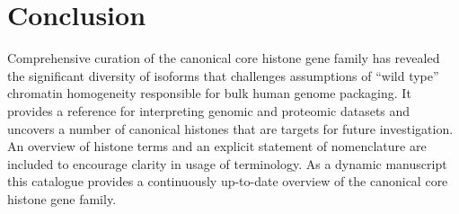 \section{Conclusion}
\label{sec:conclusion}

	Comprehensive curation of the canonical core histone gene family 
	has revealed the significant diversity of isoforms 
	that challenges assumptions of ``wild type'' chromatin homogeneity
	responsible for bulk human genome packaging.
	It provides a reference for interpreting genomic and proteomic datasets
	and uncovers a number of canonical histones that are targets for future investigation.
	An overview of histone terms and an explicit statement of nomenclature 
	are included to encourage clarity in usage of terminology.
	As a dynamic manuscript this catalogue provides a continuously up-to-date overview 
	of the canonical core histone gene family.